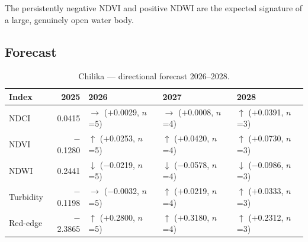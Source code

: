 \documentclass[12pt,a4paper,oneside]{report}
\begin{document}
The persistently negative NDVI and positive NDWI are the expected
signature of a large, genuinely open water body.

\subsection{Forecast}

\begin{table}[H]
\centering
\caption{Chilika --- directional forecast 2026--2028.}
\label{tab:chilika_fc}
\begin{tabular}{lrlll}
\toprule
Index & 2025 & 2026 & 2027 & 2028 \\
\midrule
NDCI & 0.0415 & $\rightarrow$ ($+$0.0029, $n$=5) & $\rightarrow$ ($+$0.0008, $n$=4) & $\uparrow$ ($+$0.0391, $n$=3) \\
NDVI & $-$0.1280 & $\uparrow$ ($+$0.0253, $n$=5) & $\uparrow$ ($+$0.0420, $n$=4) & $\uparrow$ ($+$0.0730, $n$=3) \\
NDWI & 0.2441 & $\downarrow$ ($-$0.0219, $n$=5) & $\downarrow$ ($-$0.0578, $n$=4) & $\downarrow$ ($-$0.0986, $n$=3) \\
Turbidity & $-$0.1198 & $\rightarrow$ ($-$0.0032, $n$=5) & $\uparrow$ ($+$0.0219, $n$=4) & $\uparrow$ ($+$0.0333, $n$=3) \\
Red-edge & $-$2.3865 & $\uparrow$ ($+$0.2800, $n$=5) & $\uparrow$ ($+$0.3180, $n$=4) & $\uparrow$ ($+$0.2312, $n$=3) \\
\bottomrule
\end{tabular}
\end{table}
\end{document}
